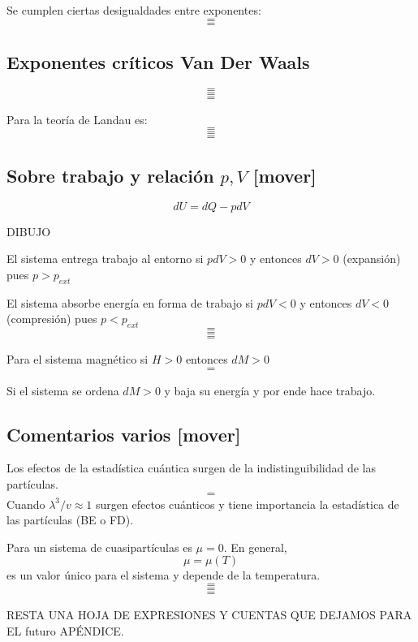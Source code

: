 \documentclass[10pt,oneside]{CBFT_book}
\begin{document}
Se cumplen ciertas desigualdades entre exponentes:
\[=\]
\[=\]

\subsection{Exponentes críticos Van Der Waals} 

\[=\]
\[=\]
\[=\]

Para la teoría de Landau es:
\[=\]
\[=\]
\[=\]

\subsection{Sobre trabajo y relación $p,V$ [mover]}

\[ 
	dU = dQ - p dV
\]

DIBUJO 

El sistema entrega trabajo al entorno si $ pdV > 0 $ y entonces $ dV > 0 $ (expansión)
pues $ p > p_{ext} $

El sistema absorbe energía en forma de trabajo si $ pdV < 0 $ y entonces $ dV < 0 $ (compresión)
pues $ p < p_{ext} $
\[=\]
\[=\]
\[=\]

Para el sistema magnético si $ H > 0 $ entonces $ dM > 0 $
\[=\]

Si el sistema se ordena $dM>0$ y baja su energía y por ende hace trabajo.

\subsection{Comentarios varios [mover]}

Los efectos de la estadística cuántica surgen de la indistinguibilidad de las partículas.
\[=\]
Cuando $\lambda^3/v \approx 1$ surgen efectos cuánticos y tiene importancia la estadística de las
partículas (BE o FD).

Para un sistema de cuasipartículas es $\mu=0$. En general,
\[
	\mu = \mu(T)
\]
es un valor único para el sistema y depende de la temperatura.
\[=\]
\[=\]
\[=\]

RESTA UNA HOJA DE EXPRESIONES Y CUENTAS QUE DEJAMOS PARA EL futuro APÉNDICE.

\end{document}
